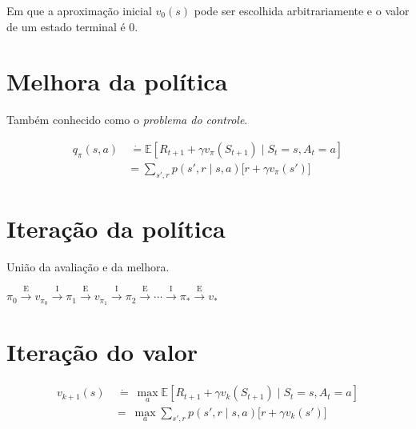 \documentclass{article}
\begin{document}
            Em que a aproximação inicial $v_0(s)$ pode ser escolhida arbitrariamente e o valor de um estado terminal é $0$.
        
    \section{Melhora da política}
    
        Também conhecido como o \textit{problema do controle}.
        
        \begin{equation}
            \begin{split}
                q_{\pi}(s,a) & \ \dot{=} \mathbb{E} \left[ R_{t+1} + \gamma v_{\pi}(S_{t+1}) \mid S_t = s, A_t = a \right] \\
                & = \sum_{s',r} p(s', r \mid s, a) \Big[ r + \gamma v_{\pi}(s') \Big]
            \end{split}
        \end{equation}
    
    \section{Iteração da política}
    
        União da avaliação e da melhora.
        
        \begin{center}
            \begin{math}
                \pi_0 \xrightarrow{\ \textrm{E} \ } 
                v_{\pi_0} \xrightarrow{\ \textrm{I} \ } 
                \pi_1 \xrightarrow{\ \textrm{E} \ } 
                v_{\pi_1} \xrightarrow{\ \textrm{I} \ } 
                \pi_2 \xrightarrow{\ \textrm{E} \ } 
                \cdots \xrightarrow{\ \textrm{I} \ }
                \pi_* \xrightarrow{\ \textrm{E} \ } v_{*}
            \end{math}
        \end{center}
        
    \section{Iteração do valor}
    
        \begin{equation}
            \begin{split}
                v_{k+1}(s) & \  \dot{=} \ \max_a \mathbb{E}[R_{t+1} + \gamma v_k(S_{t+1}) \mid S_t = s, A_t = a] \\
                & = \ \max_a \sum_{s',r} p(s', r \mid s, a) \Big[ r + \gamma v_k(s') \Big]
            \end{split}
        \end{equation}
    
\end{document}
